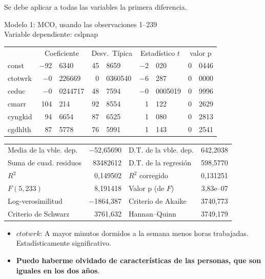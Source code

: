 Se debe aplicar a todas las variables la primera diferencia.\\

\begin{center}

Modelo 1: MCO, usando las observaciones 1--239\\
Variable dependiente: cslpnap\\

\vspace{1em}

\begin{tabular}{lr@{,}lr@{,}lr@{,}lr@{,}l}
  &
 \multicolumn{2}{c}{Coeficiente} &
  \multicolumn{2}{c}{Desv.\ Típica} &
   \multicolumn{2}{c}{Estadístico $t$} &
    \multicolumn{2}{c}{valor p} \\[1ex]
const &
  $-$92&6340 &
    45&8659 &
      $-$2&020 &
        0&0446 \\
ctotwrk &
  $-$0&226669 &
    0&0360540 &
      $-$6&287 &
        0&0000 \\
ceduc &
  $-$0&0244717 &
    48&7594 &
      $-$0&0005019 &
        0&9996 \\
cmarr &
  104&214 &
    92&8554 &
      1&122 &
        0&2629 \\
cyngkid &
  94&6654 &
    87&6525 &
      1&080 &
        0&2813 \\
cgdhlth &
  87&5778 &
    76&5991 &
      1&143 &
        0&2541 \\
\end{tabular}

\vspace{1ex}
\begin{tabular}{lrlr}
Media de la vble. dep. & $-$52,65690 & D.T. de la vble. dep. &  642,2038 \\
Suma de cuad. residuos &  83482612 & D.T. de la regresión &  598,5770 \\
$R^2$ &  0,149502 & $R^2$ corregido &  0,131251 \\
$F(5, 233)$ &  8,191418 & Valor p (de $F$) &  3,83\textrm{e--07} \\
Log-verosimilitud & $-$1864,387 & Criterio de Akaike &  3740,773 \\
Criterio de Schwarz &  3761,632 & Hannan--Quinn &  3749,179 \\
\end{tabular}


\end{center}

\begin{itemize}
    \item $ctotwrk$: A mayor minutos dormidos a la semana menos horas trabajadas. Estadísticamente significativo.
    \item \textbf{Puedo haberme olvidado de características de las personas, que son iguales en los dos años}.
\end{itemize}


